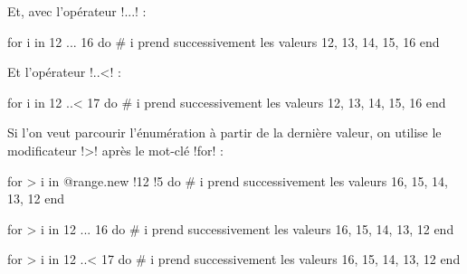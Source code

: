 Et, avec l'opérateur \ggs!...! :
\begin{galgas}
for i in 12 ... 16 do
  # i prend successivement les valeurs 12, 13, 14, 15, 16
end
\end{galgas}

Et l'opérateur \ggs!..<! :
\begin{galgas}
for i in 12 ..< 17 do
  # i prend successivement les valeurs 12, 13, 14, 15, 16
end
\end{galgas}

Si l'on veut parcourir l'énumération à partir de la dernière valeur, on utilise le modificateur \ggs!>! après le mot-clé \ggs!for! :
\begin{galgas}
for > i in @range.new {!12 !5} do
  # i prend successivement les valeurs 16, 15, 14, 13, 12
end
\end{galgas}
 
\begin{galgas}
for > i in 12 ... 16 do
  # i prend successivement les valeurs 16, 15, 14, 13, 12
end
\end{galgas}
 
\begin{galgas}
for > i in 12 ..< 17 do
  # i prend successivement les valeurs 16, 15, 14, 13, 12
end
\end{galgas}
 
